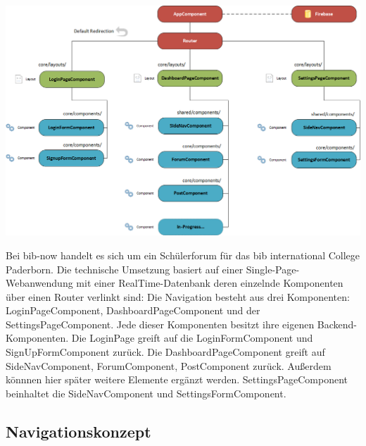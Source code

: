 \documentclass[12pt,titlepage]{article}
\begin{document}
\vspace{2cm}

\includegraphics[width=400pt]{Konzepte/bibnow_Sitemap.png}


\vspace{2cm}

Bei bib-now handelt es sich um ein Schülerforum für das bib international College Paderborn. Die technische Umsetzung basiert auf  einer Single-Page-Webanwendung mit einer RealTime-Datenbank deren einzelnde Komponenten über einen Router verlinkt sind: Die Navigation besteht aus drei Komponenten: LoginPageComponent, DashboardPageComponent und der SettingsPageComponent. Jede dieser Komponenten besitzt ihre eigenen Backend-Komponenten. Die LoginPage greift auf die LoginFormComponent und SignUpFormComponent zurück. Die DashboardPageComponent greift auf  SideNavComponent, ForumComponent, PostComponent zurück. Außerdem könnnen hier später weitere Elemente ergänzt werden. SettingsPageComponent beinhaltet die SideNavComponent und SettingsFormComponent. 


\pagebreak

\subsection{Navigationskonzept}

\vspace{2cm}
\end{document}
